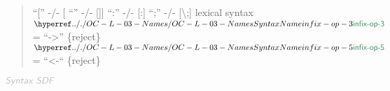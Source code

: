 \begin{quote}
     ``{[}''  -/- {[}\textbar{}{]}\newline
     ``\textbar{}''  -/- {[}{]}{]}\newline
     ``:''  -/- {[}:{]}\newline
     ``;''  -/- {[}\textbackslash{};{]}\newline
   \newline
   lexical syntax\newline
   \newline
     $\SHADE{\SYNHYPER{../.}{OC-L-03-Names}{infix-op-3}}$ = ``-\textgreater{}'' \{reject\}\newline
   \newline
     $\SHADE{\SYNHYPER{../.}{OC-L-03-Names}{infix-op-5}}$ = ``\textless{}-`` \{reject\}
\end{quote}

$\KEY{Syntax SDF}$

